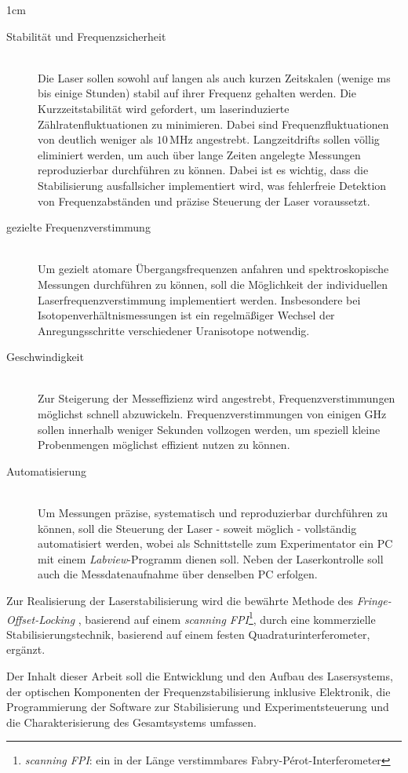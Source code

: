 \begin{setlength}{\leftmargini}{1cm}
	\begin{description}
		\item[Stabilität und Frequenzsicherheit]\hfill\\
			Die Laser sollen sowohl auf langen als auch kurzen Zeitskalen (wenige ms bis
			einige Stunden) stabil auf ihrer Frequenz gehalten werden. Die
			Kurzzeitstabilität wird gefordert, um laserinduzierte Zählratenfluktuationen
			zu minimieren. Dabei sind Frequenzfluktuationen von deutlich weniger als
			$10\,$MHz angestrebt. Langzeitdrifts sollen völlig eliminiert werden, um auch
			über lange Zeiten angelegte Messungen reproduzierbar durchführen zu können.
			Dabei ist es wichtig, dass die Stabilisierung ausfallsicher implementiert wird, was
			fehlerfreie Detektion von Frequenzabständen und präzise Steuerung der Laser
			voraussetzt.
		\item[gezielte Frequenzverstimmung]\hfill\\
			Um gezielt atomare Übergangsfrequenzen anfahren und spektroskopische
			Messungen durchführen zu können, soll die Möglichkeit der individuellen
			Laserfrequenzverstimmung implementiert werden. Insbesondere bei
			Isotopenverhältnismessungen ist ein regelmäßiger Wechsel der
			Anregungsschritte verschiedener Uranisotope notwendig.
		\item[Geschwindigkeit]\hfill\\
			Zur Steigerung der Messeffizienz wird angestrebt, Frequenzverstimmungen
			möglichst schnell abzuwickeln. Frequenzverstimmungen von einigen
			GHz sollen innerhalb weniger Sekunden vollzogen werden, um speziell kleine
			Probenmengen möglichst effizient nutzen zu können.
		\item[Automatisierung]\hfill\\
			Um Messungen präzise, systematisch und reproduzierbar durchführen zu
			können, soll die Steuerung der Laser - soweit möglich - vollständig
			automatisiert werden, wobei als Schnittstelle zum Experimentator ein PC mit
			einem \textit{Labview}-Programm dienen soll. Neben der Laserkontrolle soll
			auch die Messdatenaufnahme über denselben PC erfolgen.
	\end{description}
\end{setlength} 
Zur Realisierung der Laserstabilisierung wird die bewährte Methode des
\textit{Fringe-Offset-Locking} \cite{kuschnick:2000:diplomarbeit}, basierend auf
einem \textit{scanning FPI}\footnote{\textit{scanning FPI}: ein in der Länge
verstimmbares Fabry-Pérot-Interferometer}, durch eine kommerzielle
Stabilisierungstechnik, basierend auf einem festen Quadraturinterferometer,
ergänzt.\par
Der Inhalt dieser Arbeit soll die Entwicklung und den Aufbau des Lasersystems,
der optischen Komponenten der Frequenzstabilisierung inklusive Elektronik, die
Programmierung der Software zur Stabilisierung und Experimentsteuerung und die
Charakterisierung des Gesamtsystems umfassen.
